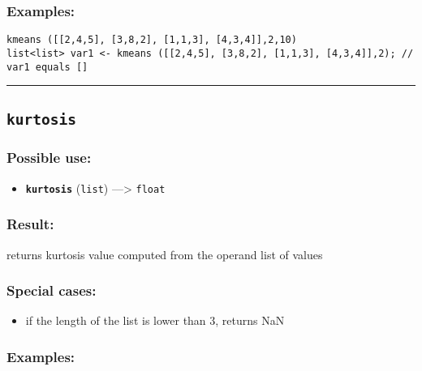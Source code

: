 \documentclass[]{book}
\providecommand{\tightlist}{%
  \setlength{\itemsep}{0pt}\setlength{\parskip}{0pt}}
\theoremstyle{definition}
\theoremstyle{definition}
\theoremstyle{definition}
\theoremstyle{remark}
\begin{document}
\subsubsection{Examples:}\label{examples-220}

\begin{verbatim}
kmeans ([[2,4,5], [3,8,2], [1,1,3], [4,3,4]],2,10)  
list<list> var1 <- kmeans ([[2,4,5], [3,8,2], [1,1,3], [4,3,4]],2); // var1 equals []
\end{verbatim}

\begin{center}\rule{0.5\linewidth}{\linethickness}\end{center}

\subsection{\texorpdfstring{\texttt{kurtosis}}{kurtosis}}\label{kurtosis}

\subsubsection{Possible use:}\label{possible-use-314}

\begin{itemize}
\tightlist
\item
  \textbf{\texttt{kurtosis}} (\texttt{list}) ---\textgreater{}
  \texttt{float}
\end{itemize}

\subsubsection{Result:}\label{result-304}

returns kurtosis value computed from the operand list of values

\subsubsection{Special cases:}\label{special-cases-83}

\begin{itemize}
\tightlist
\item
  if the length of the list is lower than 3, returns NaN
\end{itemize}

\subsubsection{Examples:}\label{examples-221}
\end{document}
